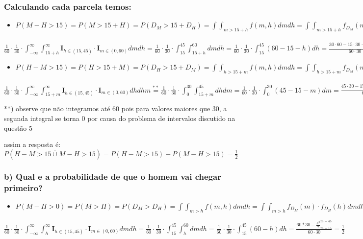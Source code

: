 \documentclass[english]{article}
\begin{document}
\subsubsection*{\textmd{Calculando cada parcela temos: }}
\begin{itemize}
\item $P(M-H>15)=P(M>15+H)=P(D{}_{M}>15+D{}_{H})=\int\int_{m>15+h}f(m,h)dmdh=\int\int_{m>15+h}f_{D{}_{M}}(m)\cdot f_{D{}_{H}}(h)dmdh=$
\end{itemize}
$\frac{1}{60}\cdot\frac{1}{30}\cdot\int_{-\infty}^{\infty}\int_{15+h}^{\infty}\mathbf{I}_{h\in(15,45)}\cdot\mathbf{I}_{m\in(0,60)}dmdh=\frac{1}{60}\cdot\frac{1}{30}\cdot\int_{15}^{45}\int_{15+h}^{60}dmdh=\frac{1}{60}\cdot\frac{1}{30}\cdot\int_{15}^{45}(60-15-h)dh=\frac{30\cdot60-15\cdot30-\frac{h^{2}}{2}_{h=15}^{h=45}}{60\cdot30}=0,25$
\begin{itemize}
\item $P(H-M>15)=P(H>15+M)=P(D{}_{H}>15+D{}_{M})=\int\int_{h>15+m}f(m,h)dmdh=\int\int_{h>15+m}f_{D{}_{M}}(m)\cdot f_{D{}_{H}}(h)dmdh=$
\end{itemize}
$\frac{1}{60}\cdot\frac{1}{30}\cdot\int_{-\infty}^{\infty}\int_{15+m}^{\infty}\mathbf{I}_{h\in(15,45)}\cdot\mathbf{I}_{m\in(0,60)}dhdhm\overset{**}{=}\frac{1}{60}\cdot\frac{1}{30}\cdot\int_{0}^{30}\int_{15+m}^{45}dhdm=\frac{1}{60}\cdot\frac{1}{30}\cdot\int_{0}^{30}(45-15-m)dm=\frac{45\cdot30-15\cdot30-\frac{m^{2}}{2}_{m=0}^{m=30}}{60\cdot30}=0,25$

{*}{*}) observe que não integramos até 60 pois para valores maiores
que 30, a segunda integral se torna 0 por causa do problema de intervalos
discutido na questão 5

assim a resposta é:$P(H-M>15\overset{.}{\cup}M-H>15)=P(H-M>15)+P(M-H>15)=\frac{1}{2}$


\subsubsection*{\textmd{b) Qual e a probabilidade de que o homem vai chegar primeiro? }}
\begin{itemize}
\item $P(M-H>0)=P(M>H)=P(D{}_{M}>D{}_{H})=\int\int_{m>h}f(m,h)dmdh=\int\int_{m>h}f_{D{}_{M}}(m)\cdot f_{D{}_{H}}(h)dmdh=$
\end{itemize}
$\frac{1}{60}\cdot\frac{1}{30}\cdot\int_{-\infty}^{\infty}\int_{h}^{\infty}\mathbf{I}_{h\in(15,45)}\cdot\mathbf{I}_{m\in(0,60)}dmdh=\frac{1}{60}\cdot\frac{1}{30}\cdot\int_{15}^{45}\int_{h}^{60}dmdh=\frac{1}{60}\cdot\frac{1}{30}\cdot\int_{15}^{45}(60-h)dh=\frac{60*30-\frac{h^{2}}{2}_{m=15}^{m=45}}{60\cdot30}=\frac{1}{2}$
\end{document}
